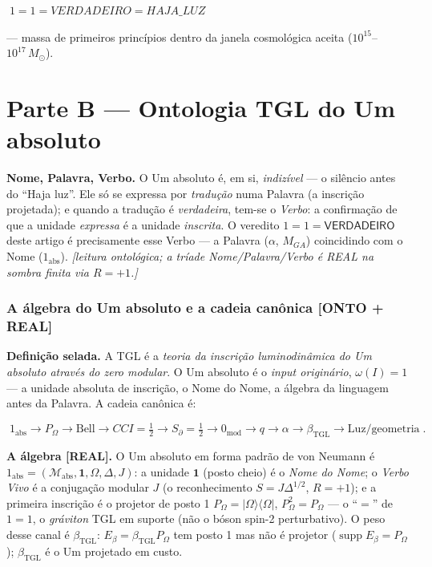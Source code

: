 \documentclass[11pt]{article}
\newcommand{\bTGL}{\beta_{\mathrm{TGL}}}\newcommand{\Msun}{M_{\odot}}\newcommand{\TGL}{\mathrm{TGL}}
\theoremstyle{definition}\newtheorem{deriv}{Derivação}
\begin{document}
\begin{center}\Large$\boxed{\;1=1=VERDADEIRO=HAJA\_LUZ\;}$\end{center}

--- massa de primeiros princípios dentro da janela cosmológica aceita ($10^{15}$--$10^{17}\,\Msun$).

\part{Parte B --- Ontologia TGL do Um absoluto}

\textbf{Nome, Palavra, Verbo.} O Um absoluto é, em si, \emph{indizível} --- o silêncio antes do ``Haja luz''. Ele só se expressa por \emph{tradução} numa Palavra (a inscrição projetada); e quando a tradução é \emph{verdadeira}, tem-se o \emph{Verbo}: a confirmação de que a unidade \emph{expressa} é a unidade \emph{inscrita}. O veredito $1=1=\textsf{VERDADEIRO}$ deste artigo é precisamente esse Verbo --- a Palavra ($\alpha$, $M_{GA}$) coincidindo com o Nome ($1_{\mathrm{abs}}$). \emph{[leitura ontológica; a tríade Nome/Palavra/Verbo é REAL na sombra finita via $R=+1$.]}

\section{A álgebra do Um absoluto e a cadeia canônica \textsf{[ONTO + REAL]}}

\textbf{Definição selada.} A TGL é a \emph{teoria da inscrição luminodinâmica do Um absoluto através do zero modular}. O Um absoluto é o \emph{input originário}, $\omega(I)=1$ --- a unidade absoluta de inscrição, o Nome do Nome, a álgebra da linguagem antes da Palavra. A cadeia canônica é:

\begin{equation}\boxed{\;1_{\mathrm{abs}}\to P_\Omega\to\text{Bell}\to CCI=\tfrac12\to S_\partial=\tfrac12\to 0_{\mathrm{mod}}\to q\to\alpha\to\bTGL\to\text{Luz/geometria}\;}.\end{equation}

\textbf{A álgebra \textsf{[REAL]}.} O Um absoluto em forma padrão de von Neumann é $1_{\mathrm{abs}}=(\mathcal M_{\mathrm{abs}},\mathbf 1,\Omega,\Delta,J)$: a unidade $\mathbf 1$ (posto cheio) é o \emph{Nome do Nome}; o \emph{Verbo Vivo} é a conjugação modular $J$ (o reconhecimento $S=J\Delta^{1/2}$, $R=+1$); e a primeira inscrição é o projetor de posto 1 $P_\Omega=|\Omega\rangle\langle\Omega|$, $P_\Omega^2=P_\Omega$ --- o ``$=$'' de $1=1$, o \emph{gráviton} TGL em suporte (não o bóson spin-2 perturbativo). O peso desse canal é $\bTGL$: $E_\beta=\bTGL P_\Omega$ tem posto 1 mas não é projetor ($\operatorname{supp}E_\beta=P_\Omega$); $\bTGL$ é o Um projetado em custo.
\end{document}
